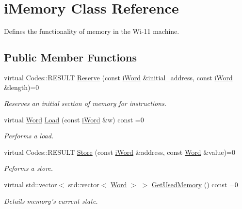 \hypertarget{classiMemory}{
\section{iMemory Class Reference}
\label{classiMemory}
}


Defines the functionality of memory in the Wi-\/11 machine.  


\subsection*{Public Member Functions}
\begin{DoxyCompactItemize}
\item 
virtual Codes::RESULT \hyperlink{classiMemory_a27750e74d09fb473c163a4cc4c3e697b}{Reserve} (const \hyperlink{classiWord}{iWord} \&initial\_\-address, const \hyperlink{classiWord}{iWord} \&length)=0
\begin{DoxyCompactList}\small\item\em Reserves an initial section of memory for instructions. \item\end{DoxyCompactList}\item 
virtual \hyperlink{classWord}{Word} \hyperlink{classiMemory_a3352ba391fc9b69a0b8691b2d585596a}{Load} (const \hyperlink{classiWord}{iWord} \&w) const =0
\begin{DoxyCompactList}\small\item\em Performs a load. \item\end{DoxyCompactList}\item 
virtual Codes::RESULT \hyperlink{classiMemory_a2632c9999797b0799a7d6b0a59bfa91a}{Store} (const \hyperlink{classiWord}{iWord} \&address, const \hyperlink{classWord}{Word} \&value)=0
\begin{DoxyCompactList}\small\item\em Peforms a store. \item\end{DoxyCompactList}\item 
virtual std::vector$<$ std::vector$<$ \hyperlink{classWord}{Word} $>$ $>$ \hyperlink{classiMemory_a1aba88f98a91fa2858b03422979e57d5}{GetUsedMemory} () const =0
\begin{DoxyCompactList}\small\item\em Details memory's current state. \item\end{DoxyCompactList}\end{DoxyCompactItemize}


